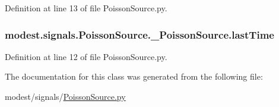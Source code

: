 Definition at line 13 of file Poisson\+Source.\+py.

\subsubsection[{\texorpdfstring{last\+Time}{lastTime}}]{\setlength{\rightskip}{0pt plus 5cm}modest.\+signals.\+Poisson\+Source.\+\_\+\+Poisson\+Source.\+last\+Time\hspace{0.3cm}{\ttfamily [inherited]}}\hypertarget{classmodest_1_1signals_1_1PoissonSource_1_1__PoissonSource_a96ba5dd0643792be6fbf7af966515a01}{}\label{classmodest_1_1signals_1_1PoissonSource_1_1__PoissonSource_a96ba5dd0643792be6fbf7af966515a01}


Definition at line 12 of file Poisson\+Source.\+py.



The documentation for this class was generated from the following file\+:\begin{DoxyCompactItemize}
\item 
modest/signals/\hyperlink{PoissonSource_8py}{Poisson\+Source.\+py}\end{DoxyCompactItemize}
